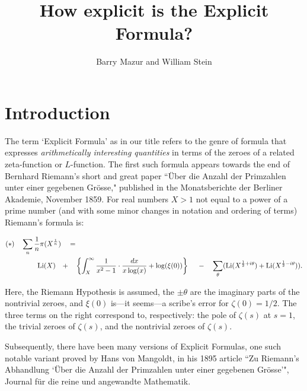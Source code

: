\documentclass[11pt]{article}
\title{How explicit is the Explicit Formula?}
\author{Barry Mazur and William Stein}
\theoremstyle{plain}
\theoremstyle{definition}
\numberwithin{equation}{section}
\numberwithin{figure}{section}
\numberwithin{table}{section}
\begin{document}
\maketitle


\vskip10pt
\section{Introduction}
\vskip10pt

The  term `Explicit Formula' as in our title refers to the genre of formula that expresses {\it arithmetically interesting quantities} in terms of the zeroes of  a related zeta-function or $L$-function.  The first such formula appears towards the end of Bernhard Riemann's short and great paper  ``\"{U}ber die Anzahl der Primzahlen unter einer
gegebenen Gr\"{o}sse," published in the
Monatsberichte der Berliner Akademie,
November 1859.  For real numbers $X>1$ not equal to a power of a prime number  (and with some minor changes in notation and ordering  of terms) Riemann's formula is:


\begin{align*}
{\bf (*)}\ \ \ \sum_{n} {\frac{1}{n}}\pi(X^{{\frac{1}{n}}}) \ \ \ &= \\
  {\rm Li}(X) \ \ \  +& \ \ \  \left\{ \int_X^{\infty}{\frac{1}{x^2-1}}\cdot {\frac{dx}{x\log(x)}} +\log(\xi(0))\right\}\ \ \ \     - \ \ \   \sum_\theta({\rm Li}(X^{{\frac{1}{2}}+i\theta})+ {\rm Li}(X^{{\frac{1}{2}}-i\theta})).
\end{align*}


Here,  the Riemann Hypothesis is assumed,
 the $\pm \theta$ are the imaginary parts of the nontrivial zeroes, and  $\xi(0)$ is---it seems---a scribe's error for  $\zeta(0)=1/2$.%
  The three terms on the right correspond to, respectively:  the pole of $\zeta(s)$ at $s=1$, the trivial zeroes of $\zeta(s)$, and the nontrivial zeroes of $\zeta(s)$.


 Subsequently, there have been many versions of Explicit Formulas, one such notable variant  proved by Hans von  Mangoldt, in his 1895 article  ``Zu Riemann's Abhandlung `\"{U}ber die Anzahl der Primzahlen unter einer gegebenen Gr\"{o}sse'", Journal f\"{u}r die reine und angewandte Mathematik.
\end{document}
